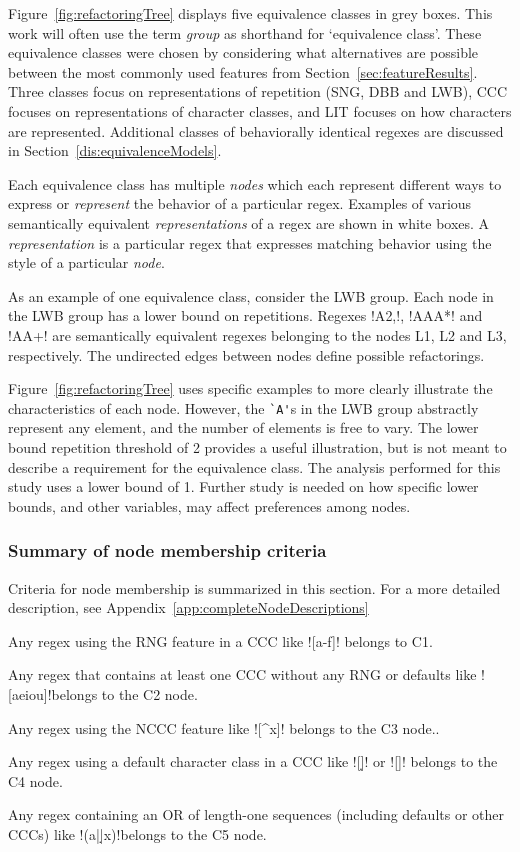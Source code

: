 Figure~\ref{fig:refactoringTree} displays five equivalence classes in grey boxes.  This work will often use the term \emph{group} as shorthand for `equivalence class'.  These equivalence classes were chosen by considering what alternatives are possible between the most commonly used features from  Section~\ref{sec:featureResults}.  Three classes focus on representations of repetition (SNG, DBB and LWB), CCC focuses on representations of character classes, and LIT focuses on how characters are represented.  Additional classes of behaviorally identical regexes are discussed in Section~\ref{dis:equivalenceModels}.

Each equivalence class has multiple \emph{nodes} which each represent different ways to express or \emph{represent} the behavior of a particular regex.  Examples of various semantically equivalent \emph{representations} of a regex are shown in white boxes. A \emph{representation} is a particular regex that expresses matching behavior using the style of a particular \emph{node}.

As an example of one equivalence class, consider the LWB group.  Each node in the LWB group has a lower bound on repetitions. Regexes \cverb!A{2,}!, \cverb!AAA*! and \cverb!AA+! are semantically equivalent regexes belonging to the nodes L1, L2 and L3, respectively.
The undirected edges between nodes define possible refactorings.

Figure~\ref{fig:refactoringTree} uses specific examples to more clearly illustrate the characteristics of each node.  However, the \verb!`A'!s in the LWB group abstractly represent any element, and the number of elements is free to vary. The lower bound repetition threshold of 2 provides a useful illustration, but is not meant to describe a requirement for the equivalence class.  The analysis performed for this study uses a lower bound of 1.  Further study is needed on how specific lower bounds, and other variables, may affect preferences among nodes.

\subsubsection{Summary of node membership criteria}
Criteria for node membership is summarized in this section.  For a more detailed description, see Appendix~\ref{app:completeNodeDescriptions}

\begin{description}  \itemsep -1pt
\item[C1:] Any regex using the RNG feature in a CCC like \cverb![a-f]! belongs to C1.
\item[C2:] Any regex that contains at least one CCC without any RNG or defaults like \cverb![aeiou]!belongs to the C2 node.
\item[C3:] Any regex using the NCCC feature like \cverb![^x]! belongs to the C3 node..
\item[C4:] Any regex using a default character class in a CCC like \cverb![\d]! or \cverb![\W]! belongs to the C4 node.
\item[C5:] Any regex containing an OR of length-one sequences (including defaults or other CCCs) like \cverb!(a|\d|x)!belongs to the C5 node.
\end{description}

